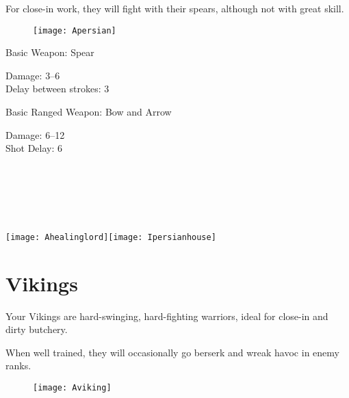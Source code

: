 For close-in work, they will fight with their spears, although not with great skill.

\begin{wrapfigure}{r}{0.5\textwidth}
	\begin{center}
		\vspace{-20pt}
		\texttt{[image: Apersian]}
	\end{center}
	\vspace{-40pt}
\end{wrapfigure}

Basic Weapon: Spear
\begin{adjustwidth}{1cm}{}
	Damage: 3–6 \\
	Delay between strokes: 3
\end{adjustwidth}
Basic Ranged Weapon: Bow and Arrow
\begin{adjustwidth}{1cm}{}
	Damage: 6–12 \\
	Shot Delay: 6 \\ \\ \\ \\ \\ \\
\end{adjustwidth}

\begin{center}
	\texttt{[image: Ahealinglord]}\hspace{1pt}\texttt{[image: Ipersianhouse]}
\end{center}

\clearpage

\section{Vikings}


Your Vikings are hard-swinging, hard-fighting warriors, ideal for close-in and dirty butchery.

When well trained, they will occasionally go berserk and wreak havoc in enemy ranks.

\begin{wrapfigure}{r}{0.5\textwidth}
	\begin{center}
		\vspace{-20pt}
		\texttt{[image: Aviking]}
	\end{center}
	\vspace{-20pt}
\end{wrapfigure}

